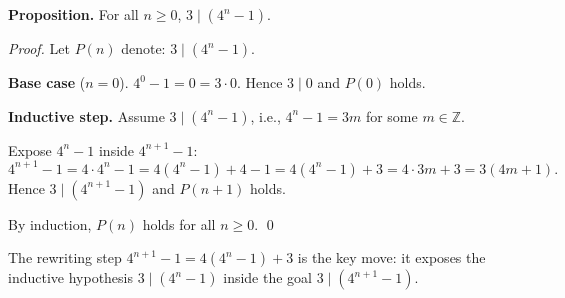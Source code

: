 \begin{example}[Divisibility]
\textbf{Proposition.}
For all $n \geq 0$, $3 \mid (4^n - 1)$.

\medskip
\noindent\textit{Proof.}
Let $P(n)$ denote: $3 \mid (4^n - 1)$.

\medskip
\noindent\textbf{Base case} ($n=0$).
$4^0 - 1 = 0 = 3 \cdot 0$. Hence $3 \mid 0$ and $P(0)$ holds.

\medskip
\noindent\textbf{Inductive step.}
Assume $3 \mid (4^n - 1)$, i.e., $4^n - 1 = 3m$ for some $m \in \mathbb{Z}$.

Expose $4^n - 1$ inside $4^{n+1} - 1$:
\[
4^{n+1} - 1 = 4 \cdot 4^n - 1
= 4(4^n - 1) + 4 - 1
= 4(4^n - 1) + 3
= 4 \cdot 3m + 3
= 3(4m + 1).
\]
Hence $3 \mid (4^{n+1}-1)$ and $P(n+1)$ holds.

By induction, $P(n)$ holds for all $n \geq 0$. \qed

\medskip
\noindent
The rewriting step $4^{n+1} - 1 = 4(4^n - 1) + 3$ is the key move:
it exposes the inductive hypothesis $3 \mid (4^n - 1)$ inside
the goal $3 \mid (4^{n+1} - 1)$.
\end{example}
